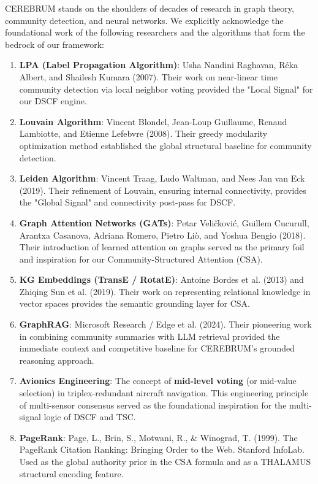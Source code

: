 \documentclass[10pt,journal,compsoc]{IEEEtran}
\begin{document}
CEREBRUM stands on the shoulders of decades of research in graph theory, community detection, and neural networks. We explicitly acknowledge the found\-ational work of the following researchers and the algorithms that form the bedrock of our framework:

\begin{enumerate}
\item \textbf{LPA (Label Propagation Algorithm)}: Usha Nandini Raghavan, Réka Albert, and Shailesh Kumara (2007). Their work on near-linear time community detection via local neighbor voting provided the "Local Signal" for our DSCF engine.
\item \textbf{Louvain Algorithm}: Vincent Blondel, Jean-Loup Guillaume, Renaud Lambiotte, and Etienne Lefebvre (2008). Their greedy modularity optim\-ization method established the global structural baseline for community detection.
\item \textbf{Leiden Algorithm}: Vincent Traag, Ludo Waltman, and Nees Jan van Eck (2019). Their refinement of Louvain, ensuring internal conne\-ctivity, provides the "Global Signal" and conne\-ctivity post-pass for DSCF.
\item \textbf{Graph Attention Networks (GATs)}: Petar Veličković, Guillem Cucurull, Arantxa Casanova, Adriana Romero, Pietro Liò, and Yoshua Bengio (2018). Their intro\-duction of learned attention on graphs served as the primary foil and inspiration for our Community-Structured Attention (CSA).
\item \textbf{KG Embeddings (TransE / RotatE)}: Antoine Bordes et al. (2013) and Zhiqing Sun et al. (2019). Their work on repre\-senting relational knowledge in vector spaces provides the semantic grounding layer for CSA.
\item \textbf{GraphRAG}: Microsoft Research / Edge et al. (2024). Their pioneering work in combining community summaries with LLM retrieval provided the immediate context and competitive baseline for CEREBRUM's grounded reasoning approach.
\item \textbf{Avionics Engineering}: The concept of \textbf{mid-level voting} (or mid-value selection) in triplex-redundant aircraft navigation. This engineering principle of multi-sensor consensus served as the found\-ational inspiration for the multi-signal logic of DSCF and TSC.
\item \textbf{PageRank}: Page, L., Brin, S., Motwani, R., \& Winograd, T. (1999). The PageRank Citation Ranking: Bringing Order to the Web. Stanford InfoLab. Used as the global authority prior in the CSA formula and as a THALAMUS structural encoding feature.

\end{enumerate}
\end{document}

